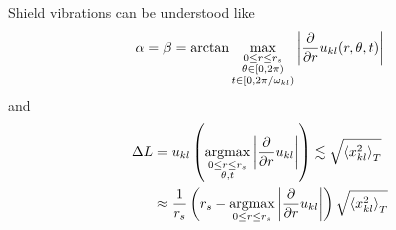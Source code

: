 Shield vibrations can be understood like
\begin{equation}
  \alpha = \beta = \arctan{\max_{\substack{0 \leq r \leq r_s \\ \theta \in[0, 2\pi) \\ t \in [0,2\pi/\omega_{kl})}} \left\lvert\pdv{r}u_{kl}(r,\theta,t)\right\rvert}
\end{equation}
and
\begin{align}
  \Delta L &= u_{kl}\left(\operatorname*{arg max}_{\substack{0 \leq r \leq r_s \\ \theta, t}} \left\lvert\pdv{r}u_{kl}\right\rvert \right) \lesssim \sqrt{\left\langle x_{kl}^2\right\rangle_T} \\
  &\approx \frac{1}{r_s} \left(r_s - \operatorname*{arg max}_{0 \leq r \leq r_s}\left\lvert\pdv{r}u_{kl}\right\rvert\right)\sqrt{\left\langle x_{kl}^2\right\rangle_T}
\end{align}


